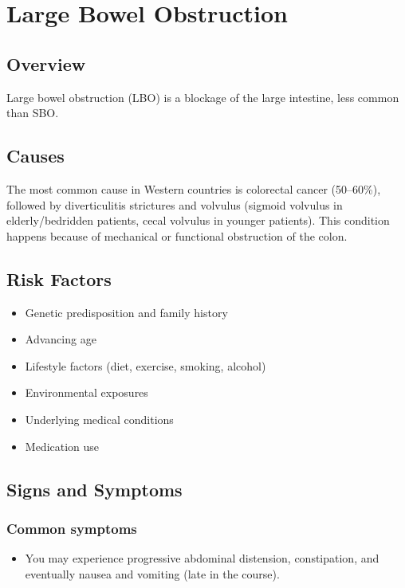 \chapter{Large Bowel Obstruction}
\label{sec:Large Bowel Obstruction}

\section{Overview}
Large bowel obstruction (LBO) is a blockage of the large intestine, less common than SBO.
\section{Causes}
The most common cause in Western countries is colorectal cancer (50--60\%), followed by diverticulitis strictures and volvulus (sigmoid volvulus in elderly/bedridden patients, cecal volvulus in younger patients). This condition happens because of mechanical or functional obstruction of the colon.     
\section{Risk Factors}

\begin{itemize}[noitemsep]
  \item Genetic predisposition and family history
  \item Advancing age
  \item Lifestyle factors (diet, exercise, smoking, alcohol)
  \item Environmental exposures
  \item Underlying medical conditions
  \item Medication use
\end{itemize}
\section{Signs and Symptoms}

\subsection{Common symptoms}
\begin{itemize}[noitemsep]
  \item You may experience progressive abdominal distension, constipation, and eventually nausea and vomiting (late in the course). 
  \end{itemize}


